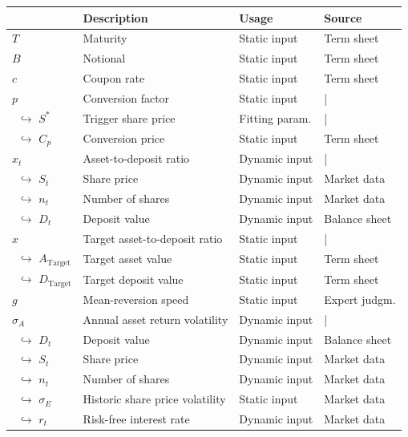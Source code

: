 \begin{table}
 \setlength{\extrarowheight}{2.5pt}
 \centering
 \footnotesize
 \begin{tabular}{p{1.8cm}p{6.8cm}p{2.4cm}p{2.5cm}}
  \toprule
    & \textbf{Description} & \textbf{Usage} & \textbf{Source} \\
  \midrule
   $T$ & Maturity & Static input & Term sheet\\
   $B$ & Notional & Static input & Term sheet \\
   $c$ & Coupon rate & Static input & Term sheet\\ 
   $p$ & Conversion factor & Static input & | \\
   $\,\,\,$$\hookrightarrow$ $S^*$ & Trigger share price & Fitting param. & | \\
   $\,\,\,$$\hookrightarrow$ $C_p$ & Conversion price & Static input & Term sheet\\
   $x_t$ & Asset-to-deposit ratio & Dynamic input & | \\
   $\,\,\,$$\hookrightarrow$ $S_t$ & Share price & Dynamic input & Market data\\
   $\,\,\,$$\hookrightarrow$ $n_t$ & Number of shares & Dynamic input & Market data\\
   $\,\,\,$$\hookrightarrow$ $D_t$ & Deposit value & Dynamic input & Balance sheet\\
   $\hat{x}$ & Target asset-to-deposit ratio & Static input & | \\
   $\,\,\,$$\hookrightarrow$ $A_\text{Target}$ & Target asset value & Static input & Term sheet \\
   $\,\,\,$$\hookrightarrow$ $D_\text{Target}$ & Target deposit value & Static input & Term sheet\\
   $g$ & Mean-reversion speed & Static input & Expert judgm.  \\
   $\sigma_A$ & Annual asset return volatility & Dynamic input & | \\
   $\,\,\,$$\hookrightarrow$ $D_t$ & Deposit value & Dynamic input & Balance sheet\\
   $\,\,\,$$\hookrightarrow$ $S_t$ & Share price & Dynamic input & Market data\\
   $\,\,\,$$\hookrightarrow$ $n_t$ & Number of shares & Dynamic input & Market data\\
   $\,\,\,$$\hookrightarrow$ $\sigma_E$& Historic share price volatility & Static input & Market data\\
   $\,\,\,$$\hookrightarrow$ $r_t$ & Risk-free interest rate & Dynamic input & Market data \\

\end{tabular}
\end{table}
